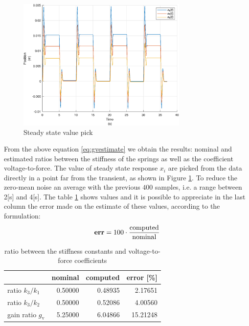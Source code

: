 \begin{figure}[htb]
	\centering
	\includegraphics[width=0.75\textwidth]{steadystate}
	\caption{Steady state value pick}
	\label{fig:steadystate}
\end{figure}\linebreak
\noindent From the above equation \eqref{eq:gvestimate} we obtain the results: nominal 
and estimated ratios between the stiffness of the springs as well as the 
coefficient voltage-to-force.
The value of steady state response \(x_{i}\) are picked from the data directly 
in a point far from the transient, as shown in Figure \ref{fig:steadystate}.
To reduce the zero-mean noise an average with the previous \(400\) samples, 
i.e. a range between 2[\si{\second}] and 4[\si{\second}].
The table \ref{tab:error} shows values and it is possible to appreciate in the 
last column the error made on the estimate of these values, according to the 
formulation:
\begin{equation}
	\label{eq:ratioerror}
	\text{\textbf{err}} = 100\cdot\frac{\text{computed}}{\text{nominal}}
\end{equation}
%
\begin{table}[ht]
\centering
	\begin{tabular}{lrrr}
	\toprule
						& nominal & computed & error [\%] \\
 	\midrule
 		ratio $k_{3}/k_{1}$	& 0.50000 & 0.48935 &	2.17651 \\
		ratio $k_{3}/k_{2}$	& 0.50000 & 0.52086 & 	4.00560 \\
		gain ratio $g_{\text{v}}$ & 5.25000 & 6.04866 &  15.21248	\\
	\bottomrule
	\end{tabular}
	\caption{ratio between the stiffness constants and voltage-to-force coefficients}
	\label{tab:error}
\end{table}
%
